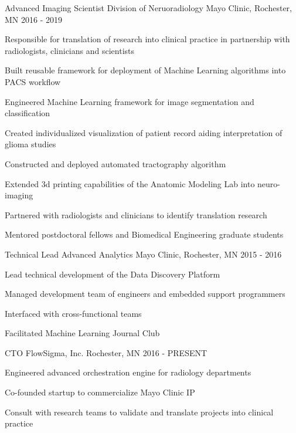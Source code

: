 \begin{cventries}
  \cventry
      {Advanced Imaging Scientist} %
      {Division of Neruoradiology} %
      {Mayo Clinic, Rochester, MN} %
      {2016 - 2019} %
      {
        \begin{cvitems}
        \item Responsible for translation of research into clinical practice in partnership with radiologists, clinicians and scientists
        \item Built reusable framework for deployment of Machine Learning algorithms into PACS workflow
        \item Engineered Machine Learning framework for image segmentation and classification
        \item Created individualized visualization of patient record aiding interpretation of glioma studies
        \item Constructed and deployed automated tractography algorithm
        \item Extended 3d printing capabilities of the Anatomic Modeling Lab into neuro-imaging
        \item Partnered with radiologists and clinicians to identify translation research
        \item Mentored postdoctoral fellows and Biomedical Engineering graduate students
        \end{cvitems}
      }
      
  \cventry
      {Technical Lead} %
      {Advanced Analytics} %
      {Mayo Clinic, Rochester, MN} %
      {2015 - 2016} %
      { 
        \begin{cvitems}
        \item{Lead technical development of the Data Discovery Platform}
        \item{Managed development team of engineers and embedded support programmers}
        \item{Interfaced with cross-functional teams}
        \item{Facilitated Machine Learning Journal Club}
        \end{cvitems}
      }
      
  \cventry
      {CTO} %
      {FlowSigma, Inc.} %
      {Rochester, MN} %
      {2016 - PRESENT} %
      { 
        \begin{cvitems}
        \item Engineered advanced orchestration engine for radiology departments
        \item Co-founded startup to commercialize Mayo Clinic IP
        \item Consult with research teams to validate and translate projects into clinical practice
        \end{cvitems}
      }
      

\end{cventries}
